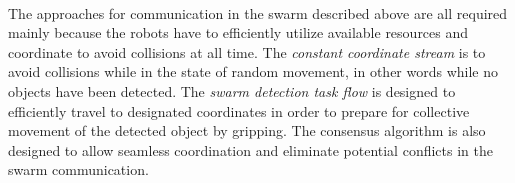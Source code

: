 \paragraph*{}
The approaches for communication in the swarm described above are all required mainly because the robots have to efficiently utilize available resources and coordinate to avoid collisions at all time. The \textit{constant coordinate stream} is to avoid collisions while in the state of random movement, in other words while no objects have been detected. The \textit{swarm detection task flow} is designed to efficiently travel to designated coordinates in order to prepare for collective movement of the detected object by gripping. The consensus algorithm is also designed to allow seamless coordination and eliminate potential conflicts in the swarm communication.
